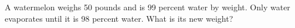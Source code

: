 A watermelon weighs 50 pounds and is 99 percent water by weight. Only water evaporates until it is 98 percent water. What is its new weight?
